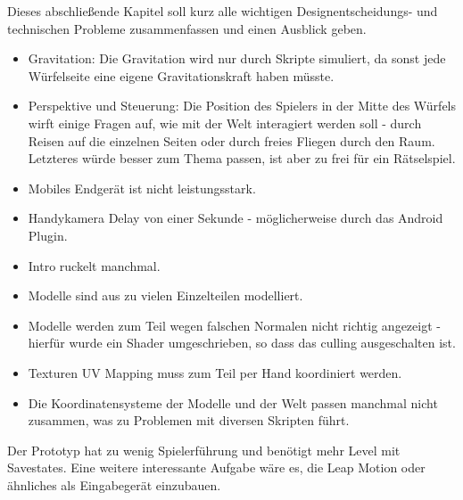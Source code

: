
Dieses abschließende Kapitel soll kurz alle wichtigen Designentscheidungs- und technischen Probleme zusammenfassen und einen Ausblick geben. 

\begin{itemize}
\item Gravitation: Die Gravitation wird nur durch Skripte simuliert, da sonst jede Würfelseite eine eigene Gravitationskraft haben müsste.
\item Perspektive und Steuerung: Die Position des Spielers in der Mitte des Würfels wirft einige Fragen auf, wie mit der Welt interagiert werden soll - durch Reisen auf die einzelnen Seiten oder durch freies Fliegen durch den Raum. Letzteres würde besser zum Thema passen, ist aber zu frei für ein Rätselspiel.
\item Mobiles Endgerät ist nicht leistungsstark.
\item Handykamera Delay von einer Sekunde - möglicherweise durch das Android Plugin.
\item Intro ruckelt manchmal.
\item Modelle sind aus zu vielen Einzelteilen modelliert.
\item Modelle werden zum Teil wegen falschen Normalen nicht richtig angezeigt - hierfür wurde ein Shader umgeschrieben, so dass das culling ausgeschalten ist.
\item Texturen UV Mapping muss zum Teil per Hand koordiniert werden.
\item Die Koordinatensysteme der Modelle und der Welt passen manchmal nicht zusammen, was zu Problemen mit diversen Skripten führt.
\end{itemize}

Der Prototyp hat zu wenig Spielerführung und benötigt mehr Level mit Savestates. Eine weitere interessante Aufgabe wäre es, die Leap Motion oder ähnliches als Eingabegerät einzubauen.